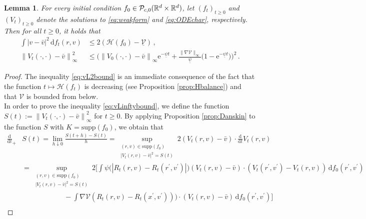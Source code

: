 \documentclass[11pt]{article}
\newtheorem{lemma}[theorem]{Lemma}
\newcommand{\R}[0]{\mathbb R}
\newcommand{\dx}[1]{\frac{\mathrm{d}}{\mathrm{d}#1}}
\newcommand{\norm}[1]{\left\| #1 \right\|}
\newcommand{\abs}[1]{\left| #1 \right|}
\newcommand{\Ppo}[1]{
    \ifx #1\infty
        \mathcal{P}_{c,0}
    \else 
        \mathcal{P}_{#1,0}
    \fi 
}
\newcommand{\supp}{\mathrm{supp}}
\newcommand{\msolinit}[1]{f_0(#1)}
\newcommand{\msolt}[2]{f_{#1}(#2)}
\newcommand{\charX}[2]{R_{#1}(#2) }
\newcommand{\charV}[2]{V_{#1}(#2)}
\begin{document}
\begin{bibunit}[unsrtnat]
\begin{lemma}\label{LVbound}
	For every initial condition $f_0 \in \Ppo{\infty}(\R^d \times \R^d)$, let $(f_t)_{t \geq 0}$ and $(V_t)_{t \geq 0}$ denote the solutions to \eqref{eq:weakform} and \eqref{eq:ODEchar}, respectively. Then for all $t \geq 0$, it holds that
    \begin{align}
        \int \abs{v-\bar{v}}^2 \, \mathrm{d}\msolt{t}{r,v} &\leq 2 (\mathcal{H}(f_0) - \underline{\mathcal{V}}) \, , \label{eq:vL2bound} \\ 
		\norm{\charV{t}{\cdot, \cdot}  - \bar{v} }_\infty ^{2} &\leq  \Big(  \norm{\charV{0}{\cdot, \cdot } - \bar{v} }_\infty   \mathrm{e}^{-\underline{\psi} t} + \frac{\big\| \nabla \mathcal{V} \big\|_{\infty}}{\underline{\psi}} \big( 1 - \mathrm{e}^{-\underline{\psi} t} \big) \Big)^{2}  \label{eq:vLinftybound} \, .
	\end{align}
\end{lemma}
\begin{proof}
    The inequality \eqref{eq:vL2bound} is an immediate consequence of the fact that the function $t \mapsto \mathcal{H}(f_t)$ is decreasing (see Proposition \ref{prop:Hbalance}) and that $\mathcal{V}$ is bounded from below. \\
	In order to prove the inequality \eqref{eq:vLinftybound}, we define the function $S(t) := \norm{ \charV{t}{\cdot, \cdot} - \bar{v}}_\infty^{2}$ for  $t \geq 0$. By applying Proposition \ref{prop:Danskin} to the function $S$ with $K = \supp (f_0)$, we obtain that 
			\begin{align*}
				\dx{t}_+& S(t) = \lim\limits_{h \downarrow 0} \frac{S(t+ h) - S(t) }{h} =   
				 \sup\limits_{\substack{(r,v) \in \supp (f_0) \\
						\abs{\charV{t}{r,v}  - \bar{v} }^{2} = S(t)}  } 2 (\charV{t}{r,v} - \bar{v}) \cdot \dx{t} \charV{t}{r,v}  \\
				 &=  \sup\limits_{\substack{(r,v) \in \supp (f_0) \\
						\abs{ \charV{t}{r,v}  - \bar{v} }^{2} = S(t)}  } 
				2\Big[ \displaystyle \int  \psi \big( \abs{\charX{t}{r,v} - \charX{t}{r^\prime, v^\prime} } \big) (\charV{t}{r,v}  - \bar{v}) \cdot (\charV{t}{r^\prime, v^\prime} -  \charV{t}{r,v} ) \, \mathrm{d}\msolinit{r^\prime, v^\prime}    \\
				&\qquad \qquad\qquad  - \int \nabla \mathcal{V}( \charX{t}{r,v}  - \charX{t}{x^\prime, v^\prime } ) ) \cdot ( \charV{t}{r,v}  - \bar{v}) \, \mathrm{d}\msolinit{r^\prime, v^\prime} \Big] \\

\end{align*}
\end{proof}
\end{bibunit}
\end{document}
